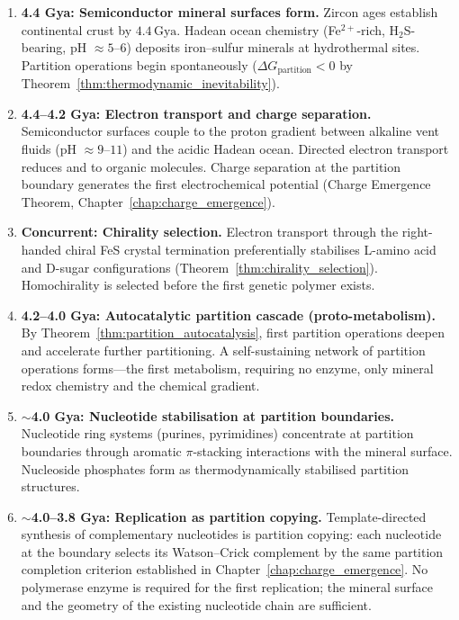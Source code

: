 \begin{enumerate}[label=\textbf{\arabic*.}]
  \item \textbf{4.4 Gya: Semiconductor mineral surfaces form.}
        Zircon ages establish continental crust by $4.4\,\mathrm{Gya}$.
        Hadean ocean chemistry (Fe$^{2+}$-rich, H$_2$S-bearing, pH $\approx 5$--$6$)
        deposits iron--sulfur minerals at hydrothermal sites. Partition operations
        begin spontaneously ($\Delta G_{\mathrm{partition}} < 0$ by
        Theorem~\ref{thm:thermodynamic_inevitability}).

  \item \textbf{4.4--4.2 Gya: Electron transport and charge separation.}
        Semiconductor surfaces couple to the proton gradient between alkaline
        vent fluids (pH $\approx 9$--$11$) and the acidic Hadean ocean.
        Directed electron transport reduces  and  to organic
        molecules. Charge separation at the partition boundary generates the
        first electrochemical potential (Charge Emergence Theorem,
        Chapter~\ref{chap:charge_emergence}).

  \item \textbf{Concurrent: Chirality selection.}
        Electron transport through the right-handed chiral FeS crystal
        termination preferentially stabilises L-amino acid and D-sugar
        configurations (Theorem~\ref{thm:chirality_selection}). Homochirality
        is selected before the first genetic polymer exists.

  \item \textbf{4.2--4.0 Gya: Autocatalytic partition cascade (proto-metabolism).}
        By Theorem~\ref{thm:partition_autocatalysis}, first partition operations
        deepen and accelerate further partitioning. A self-sustaining network
        of partition operations forms---the first metabolism, requiring no
        enzyme, only mineral redox chemistry and the chemical gradient.

  \item \textbf{$\sim$4.0 Gya: Nucleotide stabilisation at partition boundaries.}
        Nucleotide ring systems (purines, pyrimidines) concentrate at partition
        boundaries through aromatic $\pi$-stacking interactions with the mineral
        surface. Nucleoside phosphates form as thermodynamically stabilised
        partition structures.

  \item \textbf{$\sim$4.0--3.8 Gya: Replication as partition copying.}
        Template-directed synthesis of complementary nucleotides is partition
        copying: each nucleotide at the boundary selects its Watson--Crick
        complement by the same partition completion criterion established in
        Chapter~\ref{chap:charge_emergence}. No polymerase enzyme is required
        for the first replication; the mineral surface and the geometry of
        the existing nucleotide chain are sufficient.


\end{enumerate}
